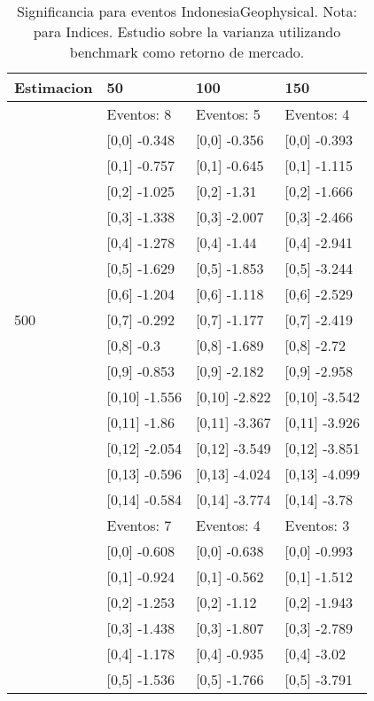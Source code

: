 \begin{table}

\caption{Significancia para eventos IndonesiaGeophysical. Nota: para Indices. Estudio sobre la varianza utilizando benchmark como retorno de mercado.}
\centering
\begin{tabular}[t]{llll}
\toprule
Estimacion & 50 & 100 & 150\\
\midrule
 & Eventos:  8 & Eventos:  5 & Eventos:  4\\
 & {}[0,0] -0.348 & {}[0,0] -0.356 & {}[0,0] -0.393\\
 & {}[0,1] -0.757 & {}[0,1] -0.645 & {}[0,1] -1.115\\
 & {}[0,2] -1.025 & {}[0,2] -1.31 & {}[0,2] -1.666\\
 & {}[0,3] -1.338 & {}[0,3] -2.007 & {}[0,3] -2.466\\
\addlinespace
 & {}[0,4] -1.278 & {}[0,4] -1.44 & {}[0,4] -2.941\\
 & {}[0,5] -1.629 & {}[0,5] -1.853 & {}[0,5] -3.244\\
 & {}[0,6] -1.204 & {}[0,6] -1.118 & {}[0,6] -2.529\\
500 & {}[0,7] -0.292 & {}[0,7] -1.177 & {}[0,7] -2.419\\
 & {}[0,8] -0.3 & {}[0,8] -1.689 & {}[0,8] -2.72\\
\addlinespace
 & {}[0,9] -0.853 & {}[0,9] -2.182 & {}[0,9] -2.958\\
 & {}[0,10] -1.556 & {}[0,10] -2.822 & {}[0,10] -3.542\\
 & {}[0,11] -1.86 & {}[0,11] -3.367 & {}[0,11] -3.926\\
 & {}[0,12] -2.054 & {}[0,12] -3.549 & {}[0,12] -3.851\\
 & {}[0,13] -0.596 & {}[0,13] -4.024 & {}[0,13] -4.099\\
\addlinespace
 & {}[0,14] -0.584 & {}[0,14] -3.774 & {}[0,14] -3.78\\
 & Eventos:  7 & Eventos:  4 & Eventos:  3\\
 & {}[0,0] -0.608 & {}[0,0] -0.638 & {}[0,0] -0.993\\
 & {}[0,1] -0.924 & {}[0,1] -0.562 & {}[0,1] -1.512\\
 & {}[0,2] -1.253 & {}[0,2] -1.12 & {}[0,2] -1.943\\
\addlinespace
 & {}[0,3] -1.438 & {}[0,3] -1.807 & {}[0,3] -2.789\\
 & {}[0,4] -1.178 & {}[0,4] -0.935 & {}[0,4] -3.02\\
 & {}[0,5] -1.536 & {}[0,5] -1.766 & {}[0,5] -3.791\\

\end{tabular}
\end{table}
